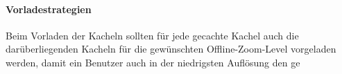 \paragraph{Vorladestrategien}
Beim Vorladen der Kacheln sollten für jede gecachte Kachel auch die darüberliegenden Kacheln für die gewünschten Offline-Zoom-Level vorgeladen werden, damit ein Benutzer auch in der niedrigsten Auflösung
den ge